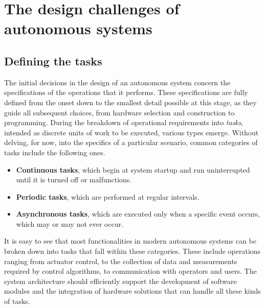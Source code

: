 \section{The design challenges of autonomous systems}
\label{sec:prb_design_challenges}
\subsection{Defining the tasks}
\label{sec:design_challenges_tasks}
The initial decisions in the design of an autonomous system concern the specifications of the operations that it performs. These specifications are fully defined from the onset down to the smallest detail possible at this stage, as they guide all subsequent choices, from hardware selection and construction to programming. During the breakdown of operational requirements into \emph{tasks}, intended as discrete units of work to be executed, various types emerge. Without delving, for now, into the specifics of a particular scenario, common categories of tasks include the following ones.

\begin{itemize}
    \item \textbf{Continuous tasks}, which begin at system startup and run uninterrupted until it is turned off or malfunctions.
    \item \textbf{Periodic tasks}, which are performed at regular intervals.
    \item \textbf{Asynchronous tasks}, which are executed only when a specific event occurs, which may or may not ever occur.
\end{itemize}

It is easy to see that most functionalities in modern autonomous systems can be broken down into tasks that fall within these categories. These include operations ranging from actuator control, to the collection of data and measurements required by control algorithms, to communication with operators and users. The system architecture should efficiently support the development of software modules and the integration of hardware solutions that can handle all these kinds of tasks.

